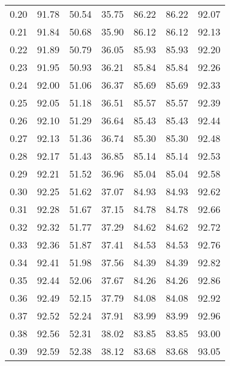 \begin{tabular}{|c|c|c|c|c|c|c|}
      0.20 &     91.78 &     50.54 &      35.75 &   86.22 &      86.22 &         92.07 \\
      0.21 &     91.84 &     50.68 &      35.90 &   86.12 &      86.12 &         92.13 \\
      0.22 &     91.89 &     50.79 &      36.05 &   85.93 &      85.93 &         92.20 \\
      0.23 &     91.95 &     50.93 &      36.21 &   85.84 &      85.84 &         92.26 \\
      0.24 &     92.00 &     51.06 &      36.37 &   85.69 &      85.69 &         92.33 \\
      0.25 &     92.05 &     51.18 &      36.51 &   85.57 &      85.57 &         92.39 \\
      0.26 &     92.10 &     51.29 &      36.64 &   85.43 &      85.43 &         92.44 \\
      0.27 &     92.13 &     51.36 &      36.74 &   85.30 &      85.30 &         92.48 \\
      0.28 &     92.17 &     51.43 &      36.85 &   85.14 &      85.14 &         92.53 \\
      0.29 &     92.21 &     51.52 &      36.96 &   85.04 &      85.04 &         92.58 \\
      0.30 &     92.25 &     51.62 &      37.07 &   84.93 &      84.93 &         92.62 \\
      0.31 &     92.28 &     51.67 &      37.15 &   84.78 &      84.78 &         92.66 \\
      0.32 &     92.32 &     51.77 &      37.29 &   84.62 &      84.62 &         92.72 \\
      0.33 &     92.36 &     51.87 &      37.41 &   84.53 &      84.53 &         92.76 \\
      0.34 &     92.41 &     51.98 &      37.56 &   84.39 &      84.39 &         92.82 \\
      0.35 &     92.44 &     52.06 &      37.67 &   84.26 &      84.26 &         92.86 \\
      0.36 &     92.49 &     52.15 &      37.79 &   84.08 &      84.08 &         92.92 \\
      0.37 &     92.52 &     52.24 &      37.91 &   83.99 &      83.99 &         92.96 \\
      0.38 &     92.56 &     52.31 &      38.02 &   83.85 &      83.85 &         93.00 \\
      0.39 &     92.59 &     52.38 &      38.12 &   83.68 &      83.68 &         93.05 \\

\end{tabular}
